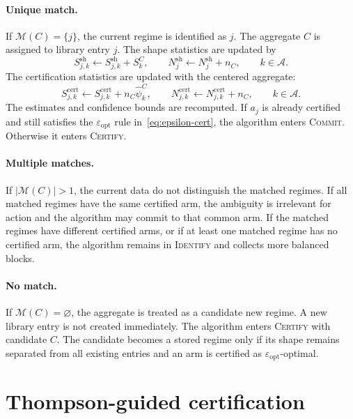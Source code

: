 \documentclass[11pt]{article}
\newcommand{\A}{\mathcal A}
\newcommand{\ID}{\textsc{Identify}\xspace}
\newcommand{\CERT}{\textsc{Certify}\xspace}
\newcommand{\COMMIT}{\textsc{Commit}\xspace}
\begin{document}
\paragraph{Unique match.}
If $\mathcal M(C)=\{j\}$, the current regime is identified as $j$. The aggregate $C$ is assigned to library entry $j$. The shape statistics are updated by
\begin{equation}
    S_{j,k}^{\mathrm{sh}}
    \leftarrow
    S_{j,k}^{\mathrm{sh}}+S_k^C,
    \qquad
    N_j^{\mathrm{sh}}
    \leftarrow
    N_j^{\mathrm{sh}}+n_C,
    \qquad k\in\A.
    \label{eq:shape-update}
\end{equation}
The certification statistics are updated with the centered aggregate:
\begin{equation}
    S_{j,k}^{\mathrm{cert}}
    \leftarrow
    S_{j,k}^{\mathrm{cert}}+n_C\widehat\psi_k^C,
    \qquad
    N_{j,k}^{\mathrm{cert}}
    \leftarrow
    N_{j,k}^{\mathrm{cert}}+n_C,
    \qquad k\in\A.
    \label{eq:cert-update-from-block}
\end{equation}
The estimates and confidence bounds are recomputed. If $a_j$ is already certified and still satisfies the $\varepsilon_{\mathrm{opt}}$ rule in~\eqref{eq:epsilon-cert}, the algorithm enters \COMMIT. Otherwise it enters \CERT.

\paragraph{Multiple matches.}
If $|\mathcal M(C)|>1$, the current data do not distinguish the matched regimes. If all matched regimes have the same certified arm, the ambiguity is irrelevant for action and the algorithm may commit to that common arm. If the matched regimes have different certified arms, or if at least one matched regime has no certified arm, the algorithm remains in \ID and collects more balanced blocks.

\paragraph{No match.}
If $\mathcal M(C)=\varnothing$, the aggregate is treated as a candidate new regime. A new library entry is not created immediately. The algorithm enters \CERT with candidate $C$. The candidate becomes a stored regime only if its shape remains separated from all existing entries and an arm is certified as $\varepsilon_{\mathrm{opt}}$-optimal.

\section{Thompson-guided certification}
\end{document}
